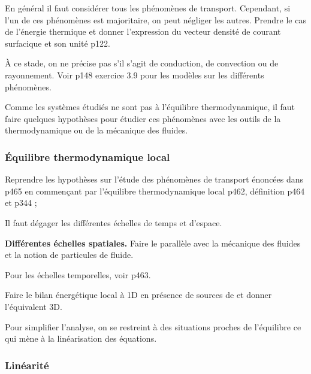 En général il faut considérer tous les phénomènes de transport.
Cependant, si l'un de ces phénomènes est majoritaire, on peut négliger les autres.
Prendre le cas de l'énergie thermique et donner l'expression du vecteur densité de courant surfacique et son unité \cite{Sanz2016} p122.

\begin{remarque}
À ce stade, on ne précise pas s'il s'agit de conduction, de convection ou de rayonnement.
Voir \cite{Sanz2016} p148 exercice 3{.}9 pour les modèles sur les différents phénomènes.
\end{remarque} 

\begin{transition}
Comme les systèmes étudiés ne sont pas à l'équilibre thermodynamique, il faut faire quelques hypothèses pour étudier ces phénomènes avec les outils de la thermodynamique ou de la mécanique des fluides.
\end{transition}

\subsubsection{Équilibre thermodynamique local}

Reprendre les hypothèses sur l'étude des phénomènes de transport énoncées dans \cite{Diu2008} p465 en commençant par l'équilibre thermodynamique local \cite{Diu2008} p462, définition p464 et \cite{Olivier2000} p344 ;

Il faut dégager les différentes échelles de temps et d'espace.
\begin{slide}
\textbf{Différentes échelles spatiales.}
Faire le parallèle avec la mécanique des fluides et la notion de particules de fluide.
\end{slide}

Pour les échelles temporelles, voir \cite{Diu2008} p463.

Faire le bilan énergétique local à 1D en présence de sources de \cite{Sanz2016} et donner l'équivalent 3D.

\begin{transition}
Pour simplifier l'analyse, on se restreint à des situations proches de l'équilibre ce qui mène à la linéarisation des équations. 
\end{transition}

\subsubsection{Linéarité}

